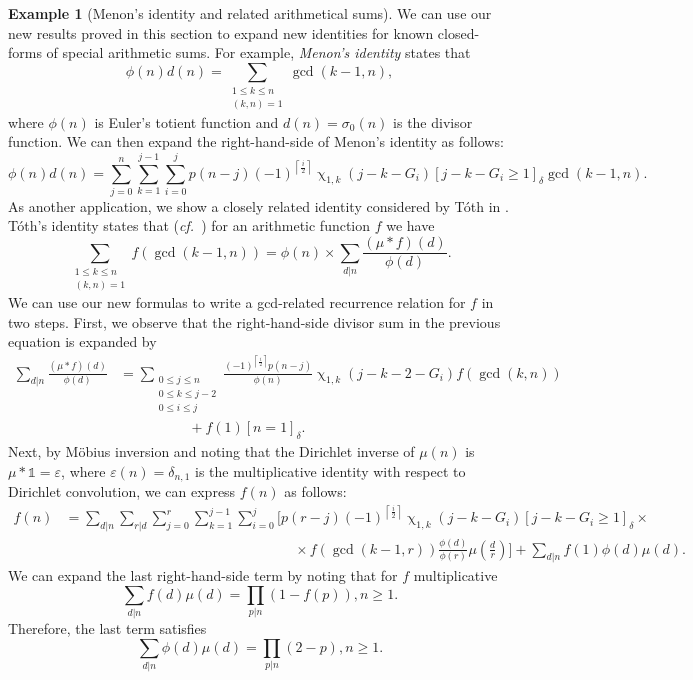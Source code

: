 \documentclass[12pt,reqno,a4letter]{article}
\numberwithin{figure}{section}
\numberwithin{table}{section}
\numberwithin{equation}{section}
\newcommand{\cf}{\textit{cf.~}}
\newcommand{\Iverson}[1]{\ensuremath{\left[#1\right]_{\delta}}}
\newcommand{\ceiling}[1]{\left\lceil #1 \right\rceil}
\renewcommand{\chi}{\upchi}
\theoremstyle{plain}
\numberwithin{theorem}{section}
\theoremstyle{definition}
\newtheorem{example}[theorem]{Example}
\begin{document}
\begin{example}[Menon's identity and related arithmetical sums] 
\label{example_Menons_Identity_Toth} 
We can use our new results proved in this section to expand new identities for 
known closed-forms of special arithmetic sums. For example, 
\emph{Menon's identity} \cite{TOTH} states that 
\[
\phi(n) d(n) = \sum_{\substack{1 \leq k \leq n \\ (k,n)=1}} \gcd(k-1, n), 
\]
where $\phi(n)$ is Euler's totient function and $d(n) = \sigma_0(n)$ is the 
divisor function. We can then expand the right-hand-side of Menon's identity as 
follows: 
\[
\phi(n) d(n) = \sum_{j=0}^n \sum_{k=1}^{j-1} \sum_{i=0}^j 
     p(n-j) (-1)^{\ceiling{\frac{i}{2}}} \chi_{1,k}(j-k-G_i) \Iverson{j-k-G_i \geq 1} 
     \gcd(k-1, n). 
\] 
As another application, we show a closely related identity considered by T\'oth in \cite{TOTH}. 
T\'oth's identity states that (\cf \cite{GCD-SUMS}) for an arithmetic function $f$ we have
\[
\sum_{\substack{1 \leq k \leq n \\ (k,n)=1}} f\left(\gcd(k-1, n)\right) = 
     \phi(n) \times \sum_{d|n} \frac{(\mu \ast f)(d)}{\phi(d)}. 
\] 
We can use our new formulas to write a gcd-related recurrence relation for $f$ 
in two steps. First, we observe that the right-hand-side divisor sum in the 
previous equation is expanded by 
\begin{align*} 
\sum_{d|n} \frac{(\mu \ast f)(d)}{\phi(d)} & = 
     \sum_{\substack{0 \leq j \leq n \\ 0 \leq k \leq j-2 \\ 0 \leq i \leq j}}
     \frac{(-1)^{\ceiling{\frac{i}{2}}} p(n-j)}{\phi(n)} 
     \chi_{1,k}(j-k-2-G_i) f(\gcd(k, n)) \\ 
     & \phantom{=\sum\qquad\ } + f(1) \Iverson{n = 1}. 
\end{align*} 
Next, by M\"obius inversion and noting that the Dirichlet inverse of $\mu(n)$ is 
$\mu \ast \mathds{1} = \varepsilon$, where $\varepsilon(n) = \delta_{n,1}$ is the multiplicative 
identity with respect to Dirichlet convolution, we can express $f(n)$ as follows: 
\begin{align*} 
f(n) & = \sum_{d|n} \sum_{r|d} \sum_{j=0}^r \sum_{k=1}^{j-1} \sum_{i=0}^j \Biggl[
     p(r-j) (-1)^{\ceiling{\frac{i}{2}}} \chi_{1,k}(j-k-G_i) \Iverson{j-k-G_i \geq 1} \times \\ 
     & \phantom{=\sum_{d|n} \sum_{r|d} \sum_{j=0}^r \sum_{k=1}^{j-1} \sum_{i=0}^j\quad\ } 
     \times 
     f(\gcd(k-1, r)) \frac{\phi(d)}{\phi(r)} \mu\left(\frac{d}{r}\right)\Biggr] + 
     \sum_{d|n} f(1) \phi(d) \mu(d). 
\end{align*} 
We can expand the last right-hand-side term by noting that for $f$ multiplicative 
\cite[\S 27]{NISTHB}
\[
\sum_{d|n} f(d) \mu(d) = \prod_{p|n} (1-f(p)), n \geq 1. 
\]
Therefore, the last term satisfies 
\[
\sum_{d|n} \phi(d) \mu(d) = \prod_{p|n} (2-p), n \geq 1. 
\]
\end{example} 
\end{document}
